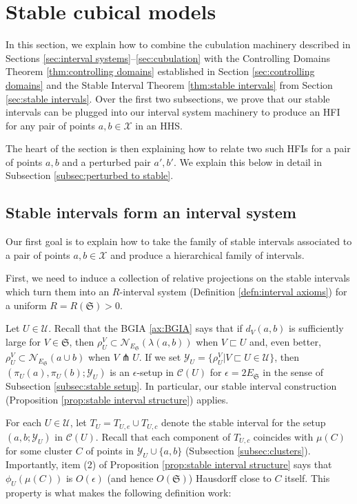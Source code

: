 \documentclass{amsart}
\theoremstyle{definition}
\theoremstyle{remark}
\theoremstyle{definition}
\newcommand{\calC}{\mathcal{C}}
\newcommand{\calN}{\mathcal{N}}
\newcommand{\calU}{\mathcal{U}}
\newcommand{\calX}{\mathcal{X}}
\newcommand{\calY}{\mathcal{Y}}
\newcommand{\ES}{E_{\mathfrak S}}
\newcommand{\nest}{\sqsubset}
\begin{document}
\newpage
\section{Stable cubical models} \label{sec:stable cubes}

In this section, we explain how to combine the cubulation machinery described in Sections \ref{sec:interval systems}--\ref{sec:cubulation} with the Controlling Domains Theorem \ref{thm:controlling domains} established in Section \ref{sec:controlling domains} and the Stable Interval Theorem \ref{thm:stable intervals} from Section \ref{sec:stable intervals}.  Over the first two subsections, we prove that our stable intervals can be plugged into our interval system machinery to produce an HFI for any pair of points $a,b \in \calX$ in an HHS.

The heart of the section is then explaining how to relate two such HFIs for a pair of points $a,b$ and a perturbed pair $a',b'$.  We explain this below in detail in Subsection \ref{subsec:perturbed to stable}.




\subsection{Stable intervals form an interval system}

Our first goal is to explain how to take the family of stable intervals associated to a pair of points $a, b\in \calX$ and produce a hierarchical family of intervals.


First, we need to induce a collection of relative projections on the stable intervals which turn them into an $R$-interval system (Definition \ref{defn:interval axioms}) for a uniform $R = R(\mathfrak S)>0$.

Let $U \in \calU$.  Recall that the BGIA \ref{ax:BGIA} says that if $d_V(a,b)$ is sufficiently large for $V \in \mathfrak S$, then $\rho^V_U \subset \calN_{\ES}(\lambda(a,b))$ when $V \nest U$ and, even better, $\rho^V_U \subset \calN_{\ES}(a \cup b)$ when $V \pitchfork U$.  If we set $\calY_U= \{\rho^V_U|V \nest U \in \calU\}$, then $(\pi_U(a), \pi_U(b); \calY_U)$ is an $\epsilon$-setup in $\calC(U)$ for $\epsilon = 2\ES$ in the sense of Subsection \ref{subsec:stable setup}.  In particular, our stable interval construction (Proposition \ref{prop:stable interval structure}) applies.

For each $U \in \calU$, let $T_U = T_{U,e} \cup T_{U,c}$ denote the stable interval for the setup $(a,b;\calY_U)$ in $\calC(U)$.  Recall that each component of $T_{U,c}$ coincides with $\mu(C)$ for some cluster $C$ of points in $\calY_U \cup \{a,b\}$ (Subsection \ref{subsec:clusters}).  Importantly, item (2) of Proposition \ref{prop:stable interval structure} says that $\phi_U(\mu(C))$ is $O(\epsilon)$ (and hence $O(\mathfrak S)$) Hausdorff close to $C$ itself.  This property is what makes the following definition work:
\end{document}
